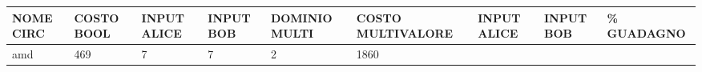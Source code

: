 \documentclass[
]{book}
\begin{document}
\begin{longtable}[]{@{}lllllllll@{}}
\toprule
\begin{minipage}[b]{0.07\columnwidth}\raggedright
NOME CIRC\strut
\end{minipage} & \begin{minipage}[b]{0.11\columnwidth}\raggedright
COSTO BOOL\strut
\end{minipage} & \begin{minipage}[b]{0.08\columnwidth}\raggedright
INPUT ALICE\strut
\end{minipage} & \begin{minipage}[b]{0.07\columnwidth}\raggedright
INPUT BOB\strut
\end{minipage} & \begin{minipage}[b]{0.09\columnwidth}\raggedright
DOMINIO MULTI\strut
\end{minipage} & \begin{minipage}[b]{0.12\columnwidth}\raggedright
COSTO MULTIVALORE\strut
\end{minipage} & \begin{minipage}[b]{0.08\columnwidth}\raggedright
INPUT ALICE\strut
\end{minipage} & \begin{minipage}[b]{0.07\columnwidth}\raggedright
INPUT BOB\strut
\end{minipage} & \begin{minipage}[b]{0.07\columnwidth}\raggedright
\% GUADAGNO\strut
\end{minipage}\tabularnewline
\midrule
\endhead
\begin{minipage}[t]{0.07\columnwidth}\raggedright
amd\strut
\end{minipage} & \begin{minipage}[t]{0.11\columnwidth}\raggedright
469\strut
\end{minipage} & \begin{minipage}[t]{0.08\columnwidth}\raggedright
7\strut
\end{minipage} & \begin{minipage}[t]{0.07\columnwidth}\raggedright
7\strut
\end{minipage} & \begin{minipage}[t]{0.09\columnwidth}\raggedright
2\strut
\end{minipage} & \begin{minipage}[t]{0.12\columnwidth}\raggedright
1860\strut
\end{minipage} & \begin{minipage}[t]{0.08\columnwidth}\raggedright

\end{minipage}
\end{longtable}
\end{document}
